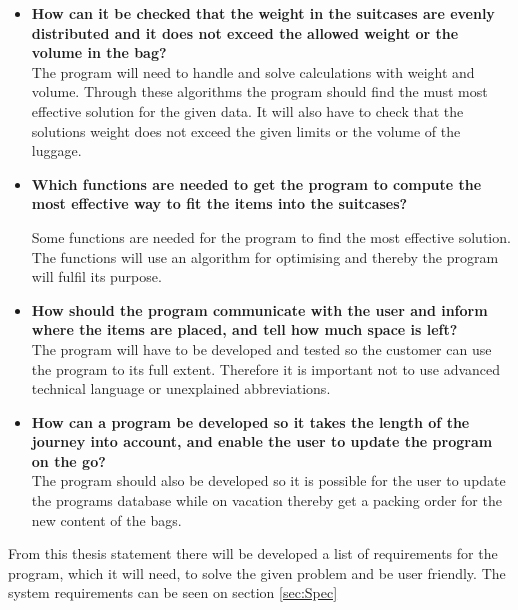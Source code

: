 \begin{itemize}
\item \textbf{How can it be checked that the weight in the suitcases are evenly distributed and it does not exceed the allowed weight or the volume in the bag?}\\

The program will need to handle and solve calculations with weight and volume. Through these algorithms the program should find the must most effective solution for the given data. It will also have to check that the solutions weight does not exceed the given limits or the volume of the luggage.

\item \textbf{Which functions are needed to get the program to compute the most effective way to fit the items into the suitcases?}\newline

Some functions are needed for the program to find the most effective solution. The functions will use an algorithm for optimising and thereby the program will fulfil its purpose.

\item \textbf{How should the program communicate with the user and inform where the items are placed, and tell how much space is left?}\\

The program will have to be developed and tested so the customer can use the program to its full extent. Therefore it is important not to use advanced technical language or unexplained abbreviations.

\item \textbf{How can a program be developed so it takes the length of the journey  into account, and enable the user to update the program on the go?}\\

The program should also be developed so it is possible for the user to update the programs database while on vacation thereby get a packing order for the new content of the bags.
\end{itemize}

From this thesis statement there will be developed a list of requirements for the program, which it will need, to solve the given problem and be user friendly. The system requirements can be seen on section \ref{sec:Spec}
